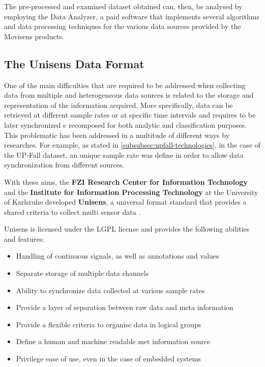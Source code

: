 The pre-processed and examined dataset obtained can, then, be analysed by employing the Data Analyzer, a paid software that implements several algorithms and data processing techniques for the various data sources provided by the Movisens products.

\subsection{The Unisens Data Format}\label{subsec:unisens}

One of the main difficulties that are required to be addressed when collecting data from multiple and heterogeneous data sources is related to the storage and representation of the information acquired. More specifically, data can be retrieved at different sample rates or at specific time intervals and requires to be later synchronized e recomposed for both analytic and classification purposes. This problematic has been addressed in a multitude of different ways by researches. For example, as stated in \ref{subsubsec:upfall-technologies}, in the case of the UP-Fall dataset, an unique sample rate was define in order to allow data synchronization from different sources. 

With these aims, the \textbf{FZI Research Center for Information Technology} and the \textbf{Institute for Information Processing Technology} at the University of Karlsruhe developed \textbf{Unisens}, a universal format standard that provides a shared criteria to collect multi sensor data \cite{unisens}.

Unisens is licensed under the LGPL license and provides the following abilities and features: 

\begin{itemize}
    \item Handling of continuous signals, as well as annotations and values
    \item Separate storage of multiple data channels
    \item Ability to synchronize data collected at various sample rates
    \item Provide a layer of separation between raw data and meta information
    \item Provide a flexible criteria to organise data in logical groups
    \item Define a human and machine readable met information source
    \item Privilege ease of use, even in the case of embedded systems
\end{itemize}

